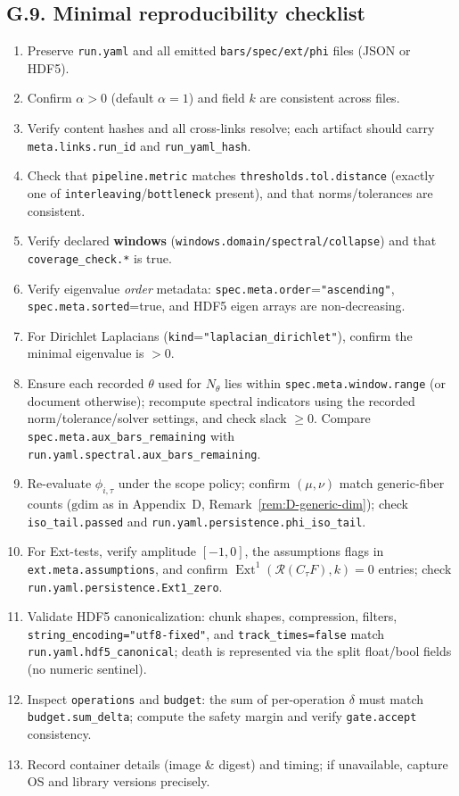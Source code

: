 \documentclass[11pt]{article}
\DeclareMathOperator{\Ext}{Ext}
\numberwithin{equation}{section}
\theoremstyle{definition}
\begin{document}
\subsection*{G.9. Minimal reproducibility checklist}
\begin{enumerate}
\item Preserve \texttt{run.yaml} and all emitted \texttt{bars/spec/ext/phi} files (JSON or HDF5).
\item Confirm \(\alpha>0\) (default \(\alpha=1\)) and field \(k\) are consistent across files.
\item Verify content hashes and all cross-links resolve; each artifact should carry \texttt{meta.links.run\_id}
and \texttt{run\_yaml\_hash}.
\item Check that \texttt{pipeline.metric} matches \texttt{thresholds.tol.distance} (exactly one of
\texttt{interleaving}/\texttt{bottleneck} present), and that norms/tolerances are consistent.
\item Verify declared \textbf{windows} (\texttt{windows.domain/spectral/collapse}) and that \texttt{coverage\_check.*} is true.
\item Verify eigenvalue \emph{order} metadata: \texttt{spec.meta.order}=\texttt{"ascending"},
\texttt{spec.meta.sorted}=true, and HDF5 eigen arrays are non-decreasing.
\item For Dirichlet Laplacians (\texttt{kind}=\texttt{"laplacian\_dirichlet"}), confirm the minimal eigenvalue is \(>0\).
\item Ensure each recorded \(\theta\) used for \(N_\theta\) lies within \texttt{spec.meta.window.range}
(or document otherwise); recompute spectral indicators using the recorded norm/tolerance/solver settings,
and check slack \(\ge 0\). Compare \texttt{spec.meta.aux\_bars\_remaining} with \texttt{run.yaml.spectral.aux\_bars\_remaining}.
\item Re-evaluate \(\phi_{i,\tau}\) under the scope policy; confirm \((\mu,\nu)\) match generic-fiber counts
(\(\mathrm{gdim}\) as in Appendix~D, Remark~\ref{rem:D-generic-dim}); check \texttt{iso\_tail.passed} and
\texttt{run.yaml.persistence.phi\_iso\_tail}.
\item For Ext-tests, verify amplitude \([-1,0]\), the assumptions flags in \texttt{ext.meta.assumptions},
and confirm \(\Ext^1(\mathcal{R}(C_\tau F),k)=0\) entries; check \texttt{run.yaml.persistence.Ext1\_zero}.
\item Validate HDF5 canonicalization: chunk shapes, compression, filters, \texttt{string\_encoding="utf8-fixed"},
and \texttt{track\_times=false} match \texttt{run.yaml.hdf5\_canonical}; death is represented via the split
float/bool fields (no numeric sentinel).
\item Inspect \texttt{operations} and \texttt{budget}: the sum of per-operation \(\delta\) must match
\texttt{budget.sum\_delta}; compute the safety margin and verify \texttt{gate.accept} consistency.
\item Record container details (image \& digest) and timing; if unavailable, capture OS and library versions precisely.
\end{enumerate}
\end{document}
